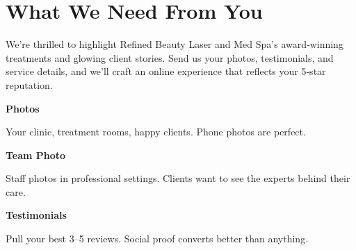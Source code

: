 \documentclass[11pt,letterpaper]{article}
\begin{document}
\vspace{0.2em}

\section*{What We Need From You}

We’re thrilled to highlight Refined Beauty Laser and Med Spa’s award‑winning treatments and glowing client stories. Send us your photos, testimonials, and service details, and we’ll craft an online experience that reflects your 5‑star reputation.

\vspace{0.12em}

\noindent\begin{minipage}[t]{0.48\textwidth}
\begin{tcolorbox}[colframe=accent-teal, boxrule=1pt, left=0.7em, right=0.7em, top=0.5em, bottom=0.5em, arc=4pt, boxsep=0pt]
{\bfseries\small\color{accent-teal}Photos}

\vspace{0.15em}

{\small Your clinic, treatment rooms, happy clients. Phone photos are perfect.}
\end{tcolorbox}

\vspace{0.1em}

\begin{tcolorbox}[colframe=accent-teal, boxrule=1pt, left=0.7em, right=0.7em, top=0.5em, bottom=0.5em, arc=4pt, boxsep=0pt]
{\bfseries\small\color{accent-teal}Team Photo}

\vspace{0.15em}

{\small Staff photos in professional settings. Clients want to see the experts behind their care.}
\end{tcolorbox}

\vspace{0.1em}

\begin{tcolorbox}[colframe=accent-teal, boxrule=1pt, left=0.7em, right=0.7em, top=0.5em, bottom=0.5em, arc=4pt, boxsep=0pt]
{\bfseries\small\color{accent-teal}Testimonials}

\vspace{0.15em}

{\small Pull your best 3--5 reviews. Social proof converts better than anything.}
\end{tcolorbox}
\end{minipage}
\end{document}
